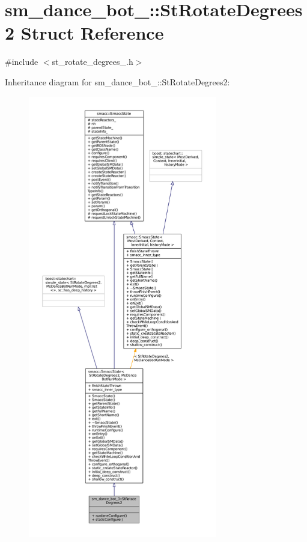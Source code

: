 \hypertarget{structsm__dance__bot__3_1_1StRotateDegrees2}{}\section{sm\+\_\+dance\+\_\+bot\+\_\+:\+:St\+Rotate\+Degrees2 Struct Reference}
\label{structsm__dance__bot__3_1_1StRotateDegrees2}


{\ttfamily \#include $<$st\+\_\+rotate\+\_\+degrees\+\_.\+h$>$}



Inheritance diagram for sm\+\_\+dance\+\_\+bot\+\_\+:\+:St\+Rotate\+Degrees2\+:
\nopagebreak
\begin{figure}[H]
\begin{center}
\leavevmode
\includegraphics[height=550pt]{structsm__dance__bot__3_1_1StRotateDegrees2__inherit__graph}
\end{center}
\end{figure}


